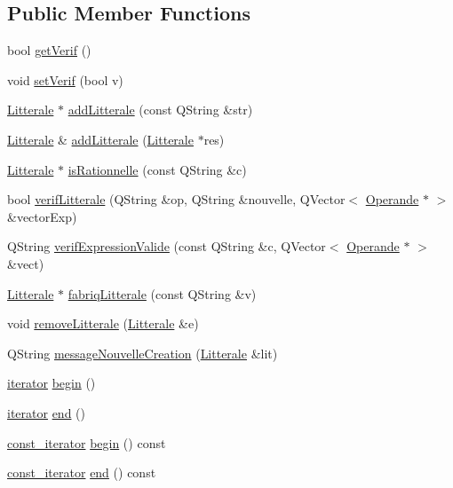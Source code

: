 \subsection*{Public Member Functions}
\begin{DoxyCompactItemize}
\item 
bool \hyperlink{class_litterale_manager_ab6a5158f0a5a94d79744188ae9540fc9}{get\+Verif} ()
\item 
void \hyperlink{class_litterale_manager_a4b1068f038f88ccd13fc78b18d979d14}{set\+Verif} (bool v)
\item 
\hyperlink{class_litterale}{Litterale} $\ast$ \hyperlink{class_litterale_manager_aba80b29edd7b1c69cd8cf3d925190523}{add\+Litterale} (const Q\+String \&str)
\item 
\hyperlink{class_litterale}{Litterale} \& \hyperlink{class_litterale_manager_a15a4544d62ce9c19f69a48f152fee97a}{add\+Litterale} (\hyperlink{class_litterale}{Litterale} $\ast$res)
\item 
\hyperlink{class_litterale}{Litterale} $\ast$ \hyperlink{class_litterale_manager_aa1bda888af4e7891092f2c4f38cda6d1}{is\+Rationnelle} (const Q\+String \&c)
\item 
bool \hyperlink{class_litterale_manager_a2430ede43517c01686653397644677a1}{verif\+Litterale} (Q\+String \&op, Q\+String \&nouvelle, Q\+Vector$<$ \hyperlink{class_operande}{Operande} $\ast$ $>$ \&vector\+Exp)
\item 
Q\+String \hyperlink{class_litterale_manager_a755bbf36636b2ad3ebb8590efdd60566}{verif\+Expression\+Valide} (const Q\+String \&c, Q\+Vector$<$ \hyperlink{class_operande}{Operande} $\ast$ $>$ \&vect)
\item 
\hyperlink{class_litterale}{Litterale} $\ast$ \hyperlink{class_litterale_manager_a8be64db76a4365bd5b287c7ed5c87ca3}{fabriq\+Litterale} (const Q\+String \&v)
\item 
void \hyperlink{class_litterale_manager_a02ac5f4d721e6cb2154c26e589e79076}{remove\+Litterale} (\hyperlink{class_litterale}{Litterale} \&e)
\item 
Q\+String \hyperlink{class_litterale_manager_a1c0db3db1e3f62e480f0717b8c10b79f}{message\+Nouvelle\+Creation} (\hyperlink{class_litterale}{Litterale} \&lit)
\item 
\hyperlink{class_litterale_manager_1_1iterator}{iterator} \hyperlink{class_litterale_manager_a4797bac6083540c62424efebba3d3b82}{begin} ()
\item 
\hyperlink{class_litterale_manager_1_1iterator}{iterator} \hyperlink{class_litterale_manager_a89555cde8edcae47c1cb682a51be5880}{end} ()
\item 
\hyperlink{class_litterale_manager_1_1const__iterator}{const\+\_\+iterator} \hyperlink{class_litterale_manager_addd9a9a3b5d5846cd4e4e88881c48821}{begin} () const 
\item 
\hyperlink{class_litterale_manager_1_1const__iterator}{const\+\_\+iterator} \hyperlink{class_litterale_manager_aa3b3319b0d2a657d1a894ec07869c2a1}{end} () const 
\end{DoxyCompactItemize}

